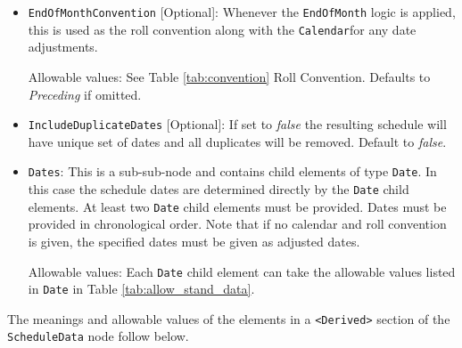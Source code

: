 \begin{itemize}
\item \lstinline!EndOfMonthConvention! [Optional]: Whenever the \lstinline!EndOfMonth! logic is applied, this is used as the roll convention along with the \lstinline!Calendar!for any date adjustments.

Allowable values: See Table \ref{tab:convention} Roll Convention. Defaults to \emph{Preceding} if omitted.

\item \lstinline!IncludeDuplicateDates! [Optional]: If set to \emph{false} the resulting schedule will have unique set of dates and all duplicates will be removed. Default to \emph{false}.

\item \lstinline!Dates!: This is a sub-sub-node and contains child elements of type
  \lstinline!Date!. In this case the schedule dates are determined
  directly by the \lstinline!Date! child elements.  At least two
  \lstinline!Date! child elements must be provided. Dates must be provided in chronological order. Note that if no calendar and roll convention is given, the specified dates must be given as adjusted dates.    

  Allowable values: Each \lstinline!Date!  child element can take the allowable values listed in \lstinline!Date! in
  Table \ref{tab:allow_stand_data}.

\end{itemize}

\medskip
The meanings and allowable values of the elements in a {\tt <Derived>} section of the \lstinline!ScheduleData! node follow below.

